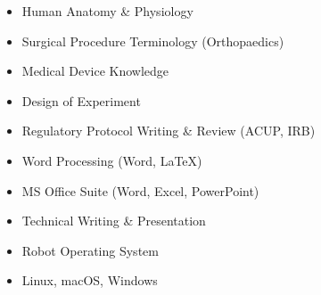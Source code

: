 \documentclass[10pt]{letter}
\begin{document}
\begin{multicols}{2}
\begin{itemize}
    \item Human Anatomy \& Physiology
    \item Surgical Procedure Terminology (Orthopaedics)
    \item Medical Device Knowledge
    \item Design of Experiment
    \item Regulatory Protocol Writing \& Review (ACUP, IRB)
    \item Word Processing (Word, \LaTeX)
    \item MS Office Suite (Word, Excel, PowerPoint)
    \item Technical Writing \& Presentation
    \item Robot Operating System
    \item Linux, macOS, Windows
\end{itemize}
\end{multicols}
\vspace{-15pt}

\end{document}
